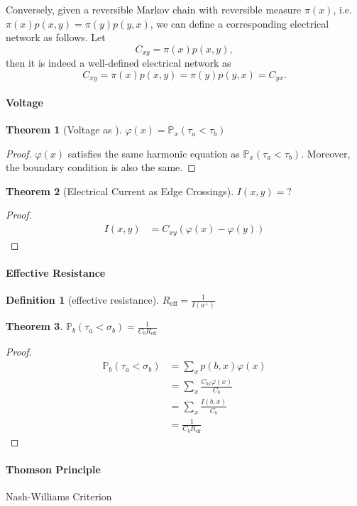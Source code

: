 \documentclass{article}
\newtheorem{Thm}{Theorem}[section]
\theoremstyle{definition}
\newtheorem{Def}{Definition}[section]
\newcommand{\PP}{\mathbb{P}}
\newcommand{\<}{\left\langle}
\renewcommand{\>}{\right\rangle}
\begin{document}
Conversely, given a reversible Markov chain with reversible measure $\pi(x)$, i.e. $\pi(x)p(x,y)=\pi(y)p(y,x)$,
we can define a corresponding electrical network as follows.
Let \[C_{xy}=\pi(x)p(x,y),\]
then it is indeed a well-defined electrical network as 
\[C_{xy}=\pi(x)p(x,y)=\pi(y)p(y,x)=C_{yx}. \]
\paragraph{Voltage}
\begin{Thm}[Voltage as ]
$\varphi(x)=\PP_x(\tau_a<\tau_b)$
\end{Thm}
\begin{proof}
    $\varphi(x)$ satisfies the same harmonic equation as $\PP_x(\tau_a<\tau_b)$.
    Moreover, the boundary condition is also the same.
\end{proof}


\begin{Thm}[Electrical Current as Edge Crossings]
    $I(x,y)=?$
\end{Thm}
\begin{proof}
    \begin{align*}
        I(x,y)&=C_{xy}(\varphi(x)-\varphi(y))
    \end{align*}
\end{proof}

\paragraph{Effective Resistance} 
\begin{Def}[effective resistance]
    $R_{\text{eff}}=\frac{1}{I(a^+)}$
\end{Def}

\begin{Thm}
    $\PP_b(\tau_a<\sigma_b)=\frac{1}{C_bR_{\text{eff}}}$
\end{Thm}
\begin{proof}
    \begin{align*}
        \PP_b(\tau_a<\sigma_b)&=\sum_x p(b,x)\varphi(x)\\
        &=\sum_x \frac{C_{bx}\varphi(x)}{C_b}\\
        &=\sum_x \frac{I(b,x)}{C_b}\\
        &=\frac{1}{C_bR_{\text{eff}}}
    \end{align*}
\end{proof}

\paragraph{Thomson Principle}
Nash-Williams Criterion
\end{document}
